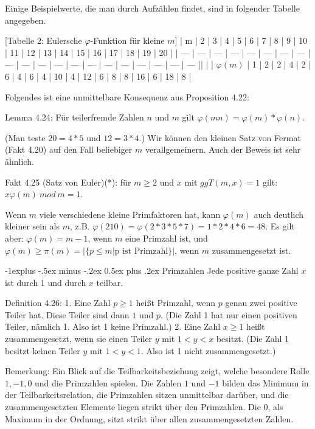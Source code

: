 \documentclass[a4paper]{article}
\makeatletter
\renewcommand{\subsection}{\@startsection{subsection}{2}{0mm}%
 {-1explus -.5ex minus -.2ex}%
 {0.5ex plus .2ex}%
 {\normalfont\normalsize\bfseries}}
\makeatother
\begin{document}
\begin{multicols}{3}
    Einige Beispielwerte, die man durch Aufzählen findet, sind in folgender Tabelle angegeben.

        [Tabelle 2: Eulersche $\varphi$-Funktion für kleine $m$]
    | m   | 2   | 3   | 4   | 5   | 6   | 7   | 8   | 9   | 10  | 11  | 12  | 13  | 14  | 15  | 16  | 17  | 18  | 19  | 20  |
    | --- | --- | --- | --- | --- | --- | --- | --- | --- | --- | --- | --- | --- | --- | --- | --- | --- | --- | --- | --- ||  |
    | $\varphi(m)$ | 1   | 2   | 2   | 4   | 2   | 6   | 4   | 6   | 4   | 10  | 4   | 12  | 6   | 8   | 8   | 16  | 6   | 18  | 8   |

    Folgendes ist eine unmittelbare Konsequenz aus Proposition 4.22:

    Lemma 4.24: Für teilerfremde Zahlen $n$ und $m$ gilt $\varphi(mn)=\varphi(m)*\varphi(n)$.

    (Man teste $20=4*5$ und $12=3*4$.)
    Wir können den kleinen Satz von Fermat (Fakt 4.20) auf den Fall beliebiger $m$ verallgemeinern. Auch der Beweis ist sehr ähnlich.

    Fakt 4.25 (Satz von Euler)(*): für $m\geq 2$ und $x$ mit $ggT(m,x) = 1$ gilt: $x\varphi(m)\ mod\ m=1$.

    Wenn $m$ viele verschiedene kleine Primfaktoren hat, kann $\varphi(m)$ auch deutlich kleiner sein als $m$, z.B. $\varphi(210) =\varphi(2*3*5*7)=1*2*4*6=48$. Es gilt aber: $\varphi(m) =m-1$, wenn $m$ eine Primzahl ist, und $\varphi(m)\geq \pi(m) =|\{p\leq m|\text{p ist Primzahl}\}|$, wenn $m$ zusammengesetzt ist.

    \subsection{Primzahlen}
    Jede positive ganze Zahl $x$ ist durch 1 und durch $x$ teilbar.

    Definition 4.26:
    1. Eine Zahl $p\geq 1$ heißt Primzahl, wenn $p$ genau zwei positive Teiler hat. Diese Teiler sind dann $1$ und $p$. (Die Zahl 1 hat nur einen positiven Teiler, nämlich 1. Also ist 1 keine Primzahl.)
    2. Eine Zahl $x\geq 1$ heißt zusammengesetzt, wenn sie einen Teiler $y$ mit $1<y < x$ besitzt. (Die Zahl 1 besitzt keinen Teiler $y$ mit $1<y<1$. Also ist 1 nicht zusammengesetzt.)

    Bemerkung: Ein Blick auf die Teilbarkeitsbeziehung zeigt, welche besondere Rolle $1,-1, 0$ und die Primzahlen spielen. Die Zahlen $1$ und $-1$ bilden das Minimum in der Teilbarkeitsrelation, die Primzahlen sitzen unmittelbar darüber, und die zusammengesetzten Elemente liegen strikt über den Primzahlen. Die $0$, als Maximum in der Ordnung, sitzt strikt über allen zusammengesetzten Zahlen.


\end{multicols}
\end{document}
